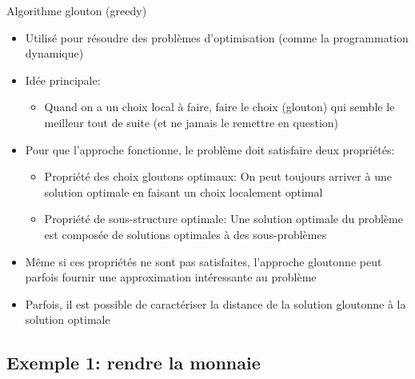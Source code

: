 \begin{frame}{Algorithme glouton (greedy)}

\begin{itemize}
\item Utilisé pour résoudre des problèmes d'optimisation (comme la programmation dynamique)
\item Idée principale:
\begin{itemize}
\item Quand on a un choix local à faire, faire le choix (glouton) qui semble le meilleur tout de suite (et ne jamais le remettre en question)
\end{itemize}
\item Pour que l'approche fonctionne, le problème doit satisfaire deux propriétés:
\begin{itemize}
\item \alert{Propriété des choix gloutons optimaux}: On peut toujours arriver
  à une solution optimale en faisant un choix localement optimal
\item \alert{Propriété de sous-structure optimale}: Une solution optimale du problème est composée de solutions optimales à des sous-problèmes
\end{itemize}
\item Même si ces propriétés ne sont pas satisfaites, l'approche
  gloutonne peut parfois fournir une approximation intéressante au problème
\item Parfois, il est possible de caractériser la distance de la
  solution gloutonne à la solution optimale
\end{itemize}

\end{frame}





\subsection{Exemple 1: rendre la monnaie}

